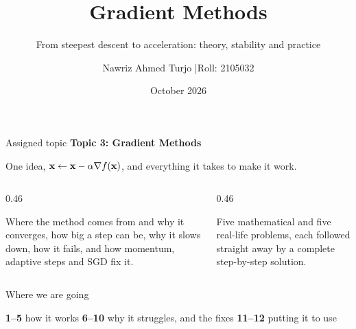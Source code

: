 \documentclass[aspectratio=169, 11pt]{beamer}
\title{Gradient Methods}
\subtitle{From steepest descent to acceleration: theory, stability and practice}
\author{Nawriz Ahmed Turjo \quad|\quad Roll: 2105032}
\institute{CSE 401: Numerical Analysis, Simulation and Modeling \quad|\quad Assignment Topic 3}
\date{October 2026}
\begin{document}
\maketitle

\begin{frame}{Assigned topic}
  \centering
  \vspace{6pt}
  {\Large\textbf{Topic 3: Gradient Methods}}

  \vspace{4pt}
  {\small One idea, $\mathbf{x}\gets\mathbf{x}-\alpha\nabla f(\mathbf{x})$, and everything it takes to make it work.}

  \vspace{12pt}
  \begin{columns}[T]
    \begin{column}{0.46\textwidth}
      \begin{keybox}
        \small Where the method comes from and why it converges, how big a step can be, why it slows down,
        how it fails, and how momentum, adaptive steps and SGD fix it.
      \end{keybox}
    \end{column}
    \begin{column}{0.46\textwidth}
      \begin{probbox}
        \small Five mathematical and five real-life problems, each followed straight away by a complete
        step-by-step solution.
      \end{probbox}
    \end{column}
  \end{columns}
\end{frame}

\begin{frame}{Where we are going}
  \centering
  \vspace{6pt}
  

  \vspace{8pt}
  \footnotesize
  \textcolor{mDarkTeal}{\textbf{1--5}} how it works \qquad
  \textcolor{mOrange}{\textbf{6--10}} why it struggles, and the fixes \qquad
  \textcolor{mGreen}{\textbf{11--12}} putting it to use
\end{frame}

\end{document}
